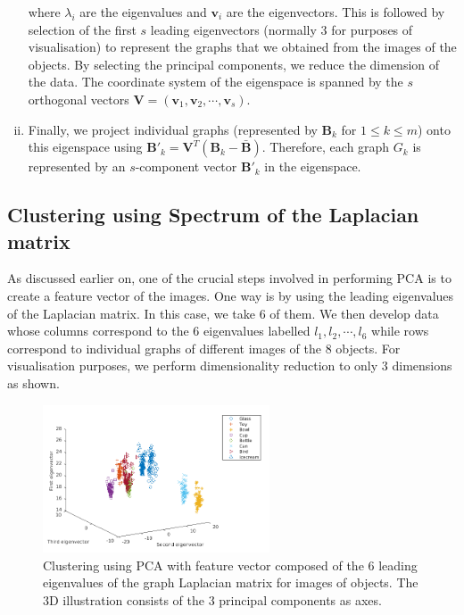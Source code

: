 \documentclass[10pt,a4paper]{article}
\theoremstyle{plain}
\theoremstyle{definition}
\begin{document}
\begin{enumerate}[i)]
\begin{equation}
	\end{equation}
	where $\lambda_i$ are the eigenvalues and $\mathbf{v}_i$ are the eigenvectors. This is followed by selection of the first $s$ leading eigenvectors (normally $3$ for purposes of visualisation) to represent the graphs that we obtained from the images of the objects. By selecting the principal components, we reduce the dimension of the data. The coordinate system of the eigenspace is spanned by the $s$ orthogonal vectors $\mathbf{V} = (\mathbf{v}_1, \mathbf{v}_2, \cdots, \mathbf{v}_s)$. 
	\item Finally, we project individual graphs (represented by $\mathbf{B}_k$ for $1\leq k \leq m$) onto this eigenspace using $\mathbf{B}'_k = \mathbf{V}^T (\mathbf{B}_k -\mathbf{\bar{B}})$. Therefore, each graph $G_k$ is represented by an $s$-component vector $\mathbf{B}'_k$ in the eigenspace.	 
\end{enumerate}

\subsection{Clustering using Spectrum of the Laplacian matrix}
As discussed earlier on, one of the crucial steps involved in performing PCA is to create a feature vector of the images. One way is by using the leading eigenvalues of the Laplacian matrix. In this case, we take $6$ of them. We then develop data whose columns correspond to the  $6$ eigenvalues labelled $l_1,l_2,\cdots,l_6$  while rows correspond to individual graphs of different images of the $8$ objects. For visualisation purposes, we perform dimensionality reduction to only $3$ dimensions as shown.
\begin{figure}[H]
	\centering
	\includegraphics[width=0.6\textwidth]{images/No-longrange.png}
	\caption{Clustering using PCA with feature vector composed of the $6$ leading eigenvalues of the graph Laplacian matrix for images of objects. The $3$D illustration consists of the $3$ principal components as axes.}
	\label{}
\end{figure}
\end{document}
